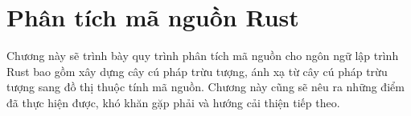 \chapter{Phân tích mã nguồn Rust}
\label{chap:method}

Chương này sẽ trình bày quy trình phân tích mã nguồn cho ngôn ngữ lập trình Rust bao gồm xây dựng cây cú pháp trừu tượng, ánh xạ từ cây cú pháp trừu tượng sang đồ thị thuộc tính mã nguồn.
Chương này cũng sẽ nêu ra những điểm đã thực hiện được, khó khăn gặp phải và hướng cải thiện tiếp theo.






